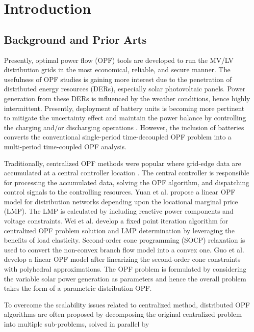 \documentclass{article}
\begin{document}
\section{Introduction}

\subsection{Background and Prior Arts}
Presently, optimal power flow (OPF) tools are developed to run the MV/LV distribution grids in the most economical, reliable, and secure manner. The usefulness of OPF studies is gaining more interest due to the penetration of distributed energy resources (DERs), especially solar photovoltaic panels. Power generation from these DERs is influenced by the weather conditions, hence highly intermittent. Presently, deployment of battery units is becoming more pertinent to mitigate the uncertainty effect and maintain the power balance by controlling the charging and/or discharging operations \cite{tgangwar}. However, the inclusion of batteries converts the conventional single-period time-decoupled OPF problem into a multi-period time-coupled OPF analysis.

Traditionally, centralized OPF methods were popular where grid-edge data are accumulated at a central controller location \cite{spaul}. The central controller is responsible for processing the accumulated data, solving the OPF algorithm, and dispatching control signals to the controlling resources. Yuan et al. \cite{Yuan} propose a linear OPF model for distribution networks depending upon the locational marginal price (LMP). The LMP is calculated by including reactive power components and voltage constraints. Wei et al. \cite{Wei} develop a fixed point iteration algorithm for centralized OPF problem solution and LMP determination by leveraging the benefits of load elasticity. Second-order cone programming (SOCP) relaxation is used to convert the non-convex branch flow model into a convex one. Guo et al. \cite{Guo} develop a linear OPF model after linearizing the second-order cone constraints with polyhedral approximations. The OPF problem is formulated by considering the variable solar power generation as parameters and hence the overall problem takes the form of a parametric distribution OPF. 

To overcome the scalability issues related to centralized method, distributed OPF algorithms are often proposed by decomposing the original centralized problem into multiple sub-problems, solved in parallel by 
\end{document}
